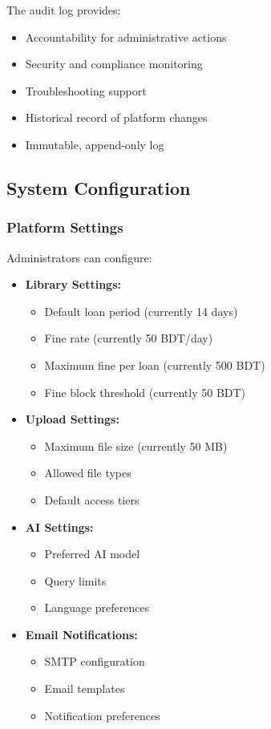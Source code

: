 \documentclass[12pt,a4paper]{article}
\begin{document}
\begin{tcolorbox}[colback=blue!5!white,colframe=primarycolor,title=Audit Log Purpose]
The audit log provides:
\begin{itemize}[leftmargin=*]
    \item Accountability for administrative actions
    \item Security and compliance monitoring
    \item Troubleshooting support
    \item Historical record of platform changes
    \item Immutable, append-only log
\end{itemize}
\end{tcolorbox}

\subsection{System Configuration}

\subsubsection{Platform Settings}
Administrators can configure:
\begin{itemize}[leftmargin=*]
    \item \textbf{Library Settings:}
        \begin{itemize}
            \item Default loan period (currently 14 days)
            \item Fine rate (currently 50 BDT/day)
            \item Maximum fine per loan (currently 500 BDT)
            \item Fine block threshold (currently 50 BDT)
        \end{itemize}
    \item \textbf{Upload Settings:}
        \begin{itemize}
            \item Maximum file size (currently 50 MB)
            \item Allowed file types
            \item Default access tiers
        \end{itemize}
    \item \textbf{AI Settings:}
        \begin{itemize}
            \item Preferred AI model
            \item Query limits
            \item Language preferences
        \end{itemize}
    \item \textbf{Email Notifications:}
        \begin{itemize}
            \item SMTP configuration
            \item Email templates
            \item Notification preferences
        \end{itemize}
\end{itemize}
\end{document}
